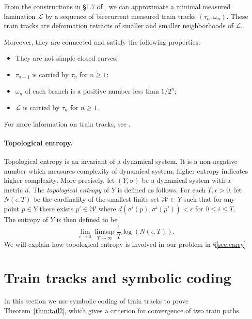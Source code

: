 \documentclass[11pt]{article} %
\theoremstyle{plain}
\theoremstyle{definition}
\numberwithin{equation}{section}
\begin{document}
From the constructions in \S1.7 of \cite{com.tr}, we can approximate a minimal measured lamination $\mathcal{L}$ by a sequence of birecurrent measured train tracks $(\tau_n, \omega_n)$. These train tracks are deformation retracts of smaller and smaller neighborhoods of $\mathcal{L}$.

Moreover, they are connected and satisfy the following properties: 
\begin{itemize}[topsep=0mm, itemsep=0mm]
\item They are not simple closed curves;
\item $\tau_{n+1}$ is carried by $\tau_n$ for $n \geq 1$;
\item $\omega_n$ of each branch is a positive number less than $1/{2^n}$;
\item $\mathcal{L}$ is carried by $\tau_n$ for $n \geq 1$.
\end{itemize}
For more information on train tracks, see \cite{com.tr}.

\paragraph{Topological entropy.} 
Topological entropy is an invariant of a dynamical system. It is a non-negative number  which measures complexity of dynamical system; higher entropy indicates higher complexity. More precisely, let $(Y,\sigma)$ be a dynamical system with a metric $d$. The \emph{topological entropy} of $Y$ is defined as follows. For each $T, \epsilon>0$, let $N(\epsilon, T)$ be the cardinality of the smallest finite set $\mathcal{W}\subset Y$ such that for any point $p \in Y$ there exists $p' \in \mathcal{W}$ where $d(\sigma^i(p),\sigma^i(p'))< \epsilon$ for $0\leq i \leq T$. The entropy of $Y$ is then defined to be
$$\lim \limits_{\epsilon \to 0} \limsup \limits_{T \to \infty}\frac{1}{T}\log(N(\epsilon,T)).$$
We will explain how topological entropy is involved in our problem in \S\ref{sec:carry}.


\section{Train tracks and symbolic coding}\label{sec:entropy}
In this section we use symbolic coding of train tracks to prove Theorem~\ref{thm:tail2}, which gives a criterion for convergence of two train paths.
\end{document}
